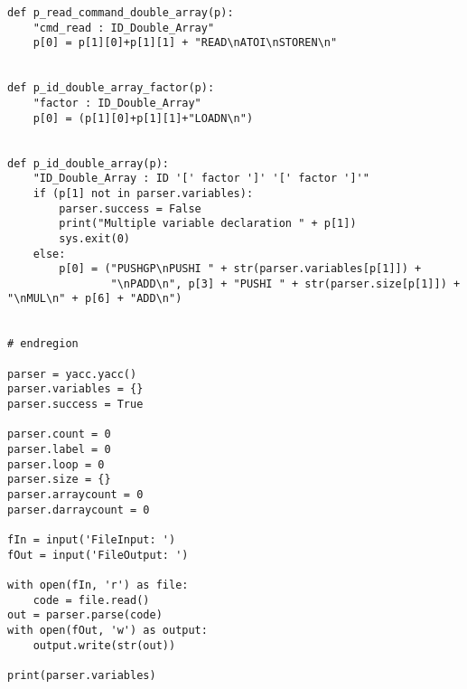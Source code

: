 \documentclass[11pt,a4paper]{report}%
\begin{document}
\begin{verbatim}
def p_read_command_double_array(p):
    "cmd_read : ID_Double_Array"
    p[0] = p[1][0]+p[1][1] + "READ\nATOI\nSTOREN\n"


def p_id_double_array_factor(p):
    "factor : ID_Double_Array"
    p[0] = (p[1][0]+p[1][1]+"LOADN\n")


def p_id_double_array(p):
    "ID_Double_Array : ID '[' factor ']' '[' factor ']'"
    if (p[1] not in parser.variables):
        parser.success = False
        print("Multiple variable declaration " + p[1])
        sys.exit(0)
    else:
        p[0] = ("PUSHGP\nPUSHI " + str(parser.variables[p[1]]) +
                "\nPADD\n", p[3] + "PUSHI " + str(parser.size[p[1]]) + "\nMUL\n" + p[6] + "ADD\n")


# endregion

parser = yacc.yacc()
parser.variables = {}
parser.success = True

parser.count = 0
parser.label = 0
parser.loop = 0
parser.size = {}
parser.arraycount = 0
parser.darraycount = 0

fIn = input('FileInput: ')
fOut = input('FileOutput: ')

with open(fIn, 'r') as file:
    code = file.read()
out = parser.parse(code)
with open(fOut, 'w') as output:
    output.write(str(out))

print(parser.variables)

\end{verbatim}
\end{document}
